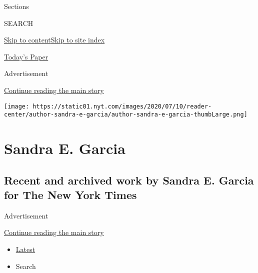 Sections

SEARCH

\protect\hyperlink{site-content}{Skip to
content}\protect\hyperlink{site-index}{Skip to site index}

\href{https://myaccount.nytimes.com/auth/login?response_type=cookie\&client_id=vi}{}

\href{https://www.nytimes.com/section/todayspaper}{Today's Paper}

Advertisement

\protect\hyperlink{after-top}{Continue reading the main story}

\texttt{[image: https://static01.nyt.com/images/2020/07/10/reader-center/author-sandra-e-garcia/author-sandra-e-garcia-thumbLarge.png]}

\hypertarget{sandra-e-garcia}{%
\section{Sandra E. Garcia}\label{sandra-e-garcia}}

\hypertarget{recent-and-archived-work-by-sandra-e-garcia-for-the-new-york-times}{%
\subsection{Recent and archived work by Sandra E. Garcia for The New
York
Times}\label{recent-and-archived-work-by-sandra-e-garcia-for-the-new-york-times}}

Advertisement

\protect\hyperlink{after-mid1}{Continue reading the main story}

\begin{itemize}
\tightlist
\item
  \protect\hyperlink{stream-panel}{Latest}
\item
  Search
\end{itemize}

